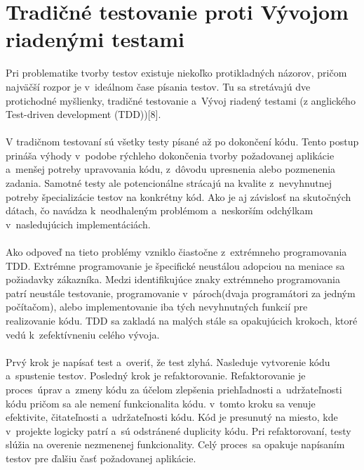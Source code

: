 \documentclass[
  printed, %
  notable,   %
  nolof,     %
    oneside,       %
  nolot,     %
]{fithesis3}
\begin{document}
\section{Tradičné testovanie proti Vývojom riadenými testami}
Pri problematike tvorby testov existuje niekoľko protikladných názorov, pričom najväčší rozpor je v~ideálnom čase písania testov. Tu sa stretávajú dve protichodné myšlienky, tradičné testovanie a~Vývoj riadený testami (z anglického  Test-driven development (TDD))[8].
\paragraph{}
V tradičnom testovaní sú všetky testy písané až po dokončení kódu. Tento postup prináša výhody v~podobe rýchleho dokončenia tvorby požadovanej aplikácie a~menšej potreby upravovania kódu, z~dôvodu upresnenia alebo pozmenenia zadania. Samotné testy ale potencionálne strácajú na kvalite z~nevyhnutnej  potreby špecializácie testov na konkrétny kód. Ako je aj závislosť na skutočných dátach, čo navádza k~neodhaleným problémom a~neskorším odchýlkam v~nasledujúcich implementáciách.\paragraph{}
Ako odpoveď na tieto problémy vzniklo čiastočne z~extrémneho programovania TDD. Extrémne programovanie je špecifické neustálou adopciou na meniace sa požiadavky zákazníka. Medzi identifikujúce znaky extrémneho programovania patrí neustále testovanie, programovanie v~pároch(dvaja programátori za jedným počítačom), alebo implementovanie  iba tých nevyhnutných funkcií pre realizovanie kódu. TDD sa zakladá na malých stále sa opakujúcich krokoch, ktoré vedú k~zefektívneniu celého vývoja. \paragraph{}
Prvý krok je napísať test a~overiť, že test zlyhá. Nasleduje vytvorenie kódu a~spustenie testov. Posledný krok je refaktorovanie. Refaktorovanie je proces~úprav a~zmeny kódu za účelom zlepšenia priehľadnosti a~udržateľnosti kódu pričom sa ale nemení funkcionalita kódu. v~tomto kroku sa venuje efektivite, čitateľnosti a~udržateľnosti kódu. Kód je presunutý na miesto, kde v~projekte logicky patrí a~sú odstránené duplicity kódu. Pri refaktorovaní, testy slúžia na overenie nezmenenej funkcionality. Celý proces~sa opakuje napísaním testov pre ďalšiu časť požadovanej aplikácie.
\end{document}
